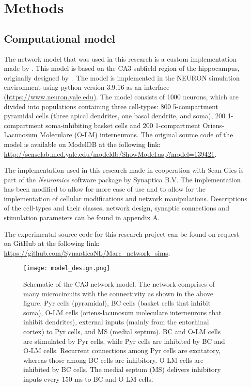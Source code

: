 \chapter{Methods}\label{ch:methods}
\section{Computational model}
The network model that was used in this research is a custom implementation
made by \textcite{sanjayImpairedDendriticInhibition2015}. This model is based
on the CA3 subfield region of the hippocampus, originally designed by~\textcite{neymotinKetamineDisruptsTheta2011}.
The model is implemented in the NEURON
simulation environment using python version 3.9.16 as an interface
\href{https://www.neuron.yale.edu}{(\url{https://www.neuron.yale.edu})}. The
model consists of 1000 neurons, which are divided into populations containing
three cell-types: 800 5-compartment pyramidal cells (three apical dendrites,
one basal dendrite, and soma), 200 1-compartment soma-inhibiting basket cells
and 200 1-compartment Oriens-Lacunosum Moleculare (O-LM) interneurons. The
original source code of the model is available on ModelDB at the following
link:
\href{http://senselab.med.yale.edu/modeldb/ShowModel.asp?model=139421}{\url{http://senselab.med.yale.edu/modeldb/ShowModel.asp?model=139421}}.

The implementation used in this research made in cooperation with Sean Gies is
part of the \textit{Neuromics} software package by Synaptica B.V. The
implementation has been modified to allow for more ease of use and to allow for
the implementation of cellular modifications and network manipulations.
Descriptions of the cell-types and their classes, network design, synaptic
connections and stimulation parameters can be found in appendix A.

The experimental source code for this research project can be found on request
on GitHub at the following link:
\href{https://github.com/SynapticaNL/Marc_network_sims}{\url{https://github.com/SynapticaNL/Marc_network_sims}}.

\begin{figure}[htbp]
    \centering
    \texttt{[image: model\_design.png]}
    \caption[Schematic of the CA3 network model]{Schematic of the CA3 network model.
        The network comprises of many microcircuits with the connectivity as shown in the above figure. Pyr cells (pyramidal), BC cells (basket cells that inhibit soma),
        O-LM cells (oriens-lacunosum moleculare interneurons that inhibit dendrites), external inputs (mainly from the entorhinal cortex) to Pyr cells, and MS (medial septum).
        BC and O-LM cells are stimulated by Pyr cells, while Pyr cells are inhibited by BC and O-LM cells.
        Recurrent connections among Pyr cells are excitatory, whereas those among BC cells are inhibitory.
        O-LM cells are inhibited by BC cells. The medial septum (MS) delivers inhibitory inputs every 150 ms to BC and O-LM cells.}\label{fig:model_design}
\end{figure}\pagebreak

